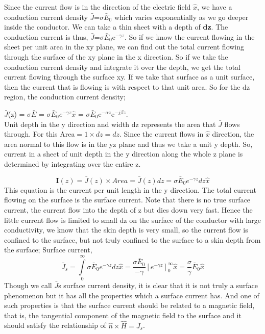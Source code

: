 Since the current flow is in the direction of the electric field $\hat{x}$, we have a conduction current density $\bar{J}$=$\sigma\bar{E}_0$ which varies exponentially as we go deeper inside the conductor. We can take a thin sheet with a depth of \textbf{dz}. The conduction current is thus, $\bar{J}$=$\sigma\bar{E}_0$e$^{-\gamma z}$. So if we know the current flowing in the sheet per unit area in the xy plane, we can find out the total current flowing through the surface of the xy plane in the x direction. So if we take the conduction current density and integrate it over the depth, we get the total current flowing through the surface xy. If we take that surface as a unit surface, then the current that is flowing is with respect to that unit area. So for the dz region, the conduction current density;

$\bar{J}$(z) = $\sigma$$\bar{E}$ = $\sigma\bar{E}_0e^{-\gamma z} \hat{x}$ = $\sigma\bar{E}_0$e$^{-\alpha z}$e$^{-j\beta z}$.\\
Unit depth in the y direction and width dz represents the area that $\bar{J}$ flows through. For this Area$=1\times dz=dz$. Since the current flows in $\hat{x}$ direction, the area normal to this flow is in the yz plane and thus we take a unit y depth. So, current in a sheet of unit depth in the y direction along the whole z plane is determined by integrating over the entire z.

\begin{dmath}
\textbf{I}(z)=\bar{J}(z)\times Area 
=\bar{J}(z)dz 
=\sigma\bar{E}_0e^{-\gamma z}dz \hat{x}
\end{dmath}
This equation is the current per unit length in the y direction. The total current flowing on the surface is the surface current. Note that there is no true surface current, the current flow into the depth of z but dies down very fast. Hence the little current flow is limited to small dz on the surface of the conductor with large conductivity, we know that the skin depth is very small, so the current flow is confined to the surface, but not truly confined to the surface to a skin depth from the surface;
Surface current,
\begin{dmath}
\bar{J}_s=\int\limits_0^\infty\sigma\bar{E}_0 e^{-\gamma z}dz\hat{x}
=\frac{\sigma\bar{E}_0}{-\gamma}[e^{-\gamma z}]_0^\infty \hat{x}=\frac{\sigma}{\gamma}\bar{E}_0\hat{x}
\end{dmath}
Though we call $\bar{J}$s surface current density, it is clear that it is not truly a surface phenomenon but it has all the properties which a surface current has. And one of such properties is that the surface current should be related to a magnetic field, that is, the tangential component of the magnetic field to the surface and it should satisfy the relationship of $\hat{n}\times\hat{H}=\bar{J}_s$. 

